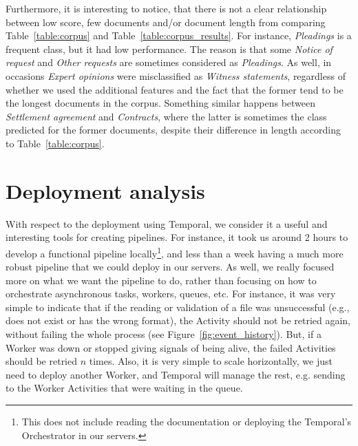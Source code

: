 \documentclass[11pt]{article}
\begin{document}
    Furthermore, it is interesting to notice, that there is not a clear relationship between low score, few documents and/or document length from comparing Table~\ref{table:corpus} and Table~\ref{table:corpus_results}. For instance, \textit{Pleadings} is a frequent class, but it had low performance. The reason is that some \textit{Notice of request} and \textit{Other requests} are sometimes considered as \textit{Pleadings}. As well, in occasions \textit{Expert opinions} were misclassified as \textit{Witness statements}, regardless of whether we used the additional features and the fact that the former tend to be the longest documents in the corpus. Something similar happens between \textit{Settlement agreement} and \textit{Contracts}, where the latter is sometimes the class predicted for the former documents, despite their difference in length according to Table~\ref{table:corpus}.

    

\section{Deployment analysis}
\label{sec: lessons}

    With respect to the deployment using Temporal, we consider it a useful and interesting tools for creating pipelines. For instance, it took us around 2 hours to develop a functional pipeline locally\footnote{This does not include reading the documentation or deploying the Temporal's Orchestrator in our servers.}, and less than a week having a much more robust pipeline that we could deploy in our servers. As well, we really focused more on what we want the pipeline to do, rather than focusing on how to orchestrate asynchronous tasks, workers, queues, etc. For instance, it was very simple to indicate that if the reading or validation of a file was unsuccessful (e.g., does not exist or has the wrong format), the Activity should not be retried again, without failing the whole process (see Figure~\ref{fig:event_history}). But, if a Worker was down or stopped giving signals of being alive, the failed Activities should be retried $n$ times. Also, it is very simple to scale horizontally, we just need to deploy another Worker, and Temporal will manage the rest, e.g. sending to the Worker Activities that were waiting in the queue.
\end{document}
